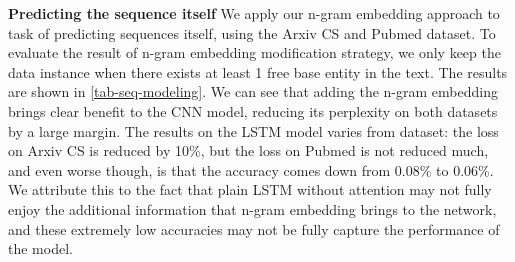 \noindent \textbf{Predicting the sequence itself}
We apply our n-gram embedding  approach to task of predicting sequences itself, using the Arxiv CS and Pubmed dataset. To evaluate the result of n-gram embedding modification strategy, we only keep the data instance when there exists at least 1 free base entity in the text. The results are shown in \autoref{tab-seq-modeling}. We can see that adding the n-gram embedding brings clear benefit to the CNN model, reducing its perplexity on both datasets by a large margin. The results on the LSTM model varies from dataset: the loss on Arxiv CS is reduced by 10\%, but the loss on Pubmed is not reduced much, and even worse though, is that the accuracy comes down from 0.08\% to 0.06\%. 
 We attribute this to the fact that plain LSTM without attention may not fully enjoy the additional information that n-gram embedding brings to the network, and these extremely low accuracies may not be fully capture the performance of the model.


\begin{table*}
\vspace{15pt}
\caption{Results of N-gram embedding on Language Modeling}
\label{tab-seq-modeling}

\centering
{}

\vspace{-15pt}
\end{table*}


